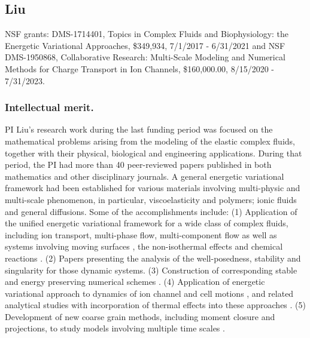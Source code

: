 \documentclass[11pt]{NSFamsart}
\begin{document}
{%
\subsection*{Liu} NSF grants: DMS-1714401,  Topics in Complex Fluids and Biophysiology: the Energetic Variational Approaches, \$349,934, 7/1/2017 - 6/31/2021 and 
{NSF DMS-1950868, Collaborative Research: Multi-Scale Modeling and Numerical Methods for Charge Transport in Ion Channels, \$160,000.00, 8/15/2020 - 7/31/2023.}

 \subsubsection*{Intellectual merit.}  
PI Liu's research work during the last funding period was focused on the mathematical problems
arising from the modeling of the elastic complex fluids, together
with their physical, biological and engineering applications.
During that period, the PI had more than 40 peer-reviewed papers published in both mathematics and  other disciplinary journals. A general energetic variational framework had been established for various materials
involving multi-physic and multi-scale phenomenon,  in particular, viscoelasticity and polymers;  ionic fluids and general diffusions.
Some of the accomplishments include: (1) Application of the unified energetic variational framework for a wide class of complex fluids, including ion transport, multi-phase flow,
multi-component flow as well as systems involving moving  surfaces \cite{HuLiLi18,
yang_thermodynamically_2018,benesova_existence_2018, deng_largest_2017,xu_strong_2017,benesova_existence_2018,liu_energetic_2019, Kirshtein2020}, the non-isothermal effects \cite{de2019non,liu2018non, hsieh2020global, Jan-Eric}
and chemical reactions \cite{terebus2018discrete, wang2020field}. 
(2) Papers \cite{liu_energetic_2019, epshteyn2019large, Jan-Eric, hsieh2020global} presenting the analysis of the well-posedness, stability and singularity
for those dynamic systems. (3) Construction of corresponding stable and energy preserving numerical schemes \cite{duan_numerical_2019,xu_numerical_2019,duan_numerical_2019-2, wu2019energetic, liu2020lagrangian, liu2020variational, liu2020structure,duan2020structure}.
 (4)  Application of energetic variational approach to dynamics of ion channel and cell motions \cite{horng_continuum_2019,gavish_bistable_2018, liu_generalized_2017},
and related analytical studies \cite{WaLiTa17, hsieh2020global} with incorporation of thermal effects into these approaches \cite{liu2018non, wu2019energetic, hsieh2020global}.  (5) Development of new coarse grain  methods, including moment closure and projections, to study models involving multiple time scales
\cite{ma_fluctuation-dissipation_2017,ma_coarse-graining_2019}.

}
\end{document}
